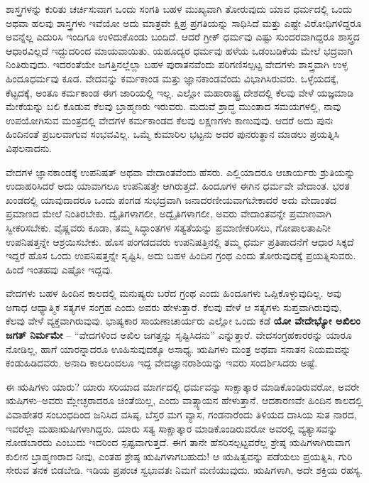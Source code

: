 ಶಾಸ್ತ್ರಗಳನ್ನು ಕುರಿತು ಚರ್ಚಿಸುವಾಗ ಒಂದು ಸಂಗತಿ ಬಹಳ ಮುಖ್ಯವಾಗಿ ತೋರುವುದು ಯಾವ ಧರ್ಮದಲ್ಲಿ ಒಂದು ಅಥವಾ ಹಲವು ಶಾಸ್ತ್ರಗಳು ಇವೆಯೋ ಅದು ಮಾತ್ರವೇ ಕ್ಷಿಪ್ರ ಪ್ರಗತಿಯನ್ನು ಸಾಧಿಸಿದೆ ಮತ್ತು ಎಷ್ಟೇ ವಿರೋಧಿಗಳಿದ್ದರೂ ಅವನ್ನೆಲ್ಲ ಎದುರಿಸಿ ಇಂದಿಗೂ ಉಳಿದುಕೊಂಡು ಬಂದಿದೆ. ಆದರೆ ಗ್ರೀಕ್​ ಧರ್ಮವು ಎಷ್ಟು ಸುಂದರವಾಗಿದ್ದರೂ ಶಾಸ್ತ್ರದ ಆಧಾರವಿಲ್ಲದೆ ಇದ್ದುದರಿಂದ ಮಾಯವಾಯಿತು. ಯಹೂದ್ಯರ ಧರ್ಮವು ಹಳೆಯ ಒಡಂಬಡಿಕೆಯ ಮೇಲೆ ಭದ್ರವಾಗಿ ನಿಂತಿರುವುದು. ಇದರಂತೆಯೇ ಜಗತ್ತಿನಲ್ಲೆಲ್ಲಾ ಬಹಳ ಪುರಾತನವೆಂದು ಪರಿಗಣಿಸಲ್ಪಟ್ಟ ವೇದಗಳು ಶಾಸ್ತ್ರವಾಗಿ ಉಳ್ಳ ಹಿಂದೂಧರ್ಮವು ಕೂಡ. ವೇದವನ್ನು ಕರ್ಮಕಾಂಡ ಮತ್ತು ಜ್ಞಾನಕಾಂಡವೆಂದು ವಿಭಾಗಿಸಿರುವರು. ಒಳ್ಳೆಯದಕ್ಕೆ, ಕೆಟ್ಟದಕ್ಕೆ, ಅಂತೂ ಕರ್ಮಕಾಂಡ ಈಗ ಜಾರಿಯಲ್ಲಿ ಇಲ್ಲ. ಎಲ್ಲೋ ಮಹಾರಾಷ್ಟ್ರ ದೇಶದಲ್ಲಿ ಕೆಲವು ವೇಳೆ ಯಜ್ಞಮಾಡಿ ಮೇಕೆಯನ್ನು ಬಲಿ ಕೊಡುವ ಕೆಲವು ಬ್ರಾಹ್ಮಣರು ಇರುವರು. ಮದುವೆ ಶ್ರಾದ್ಧ ಮುಂತಾದ ಸಮಯಗಳಲ್ಲಿ, ನಾವು ಉಪಯೋಗಿಸುವ ಮಂತ್ರದಲ್ಲಿ ವೇದಗಳ ಕರ್ಮಕಾಂಡದ ಕೆಲವು ಲಕ್ಷಣಗಳು ಕಾಣುವುವು. ಆದರೆ ಅದು ಪುನಃ ಹಿಂದಿನಂತೆ ಪ್ರಬಲವಾಗುವ ಸಂಭವವಿಲ್ಲ. ಒಮ್ಮೆ ಕುಮಾರಿಲ ಭಟ್ಟನು ಅದರ ಪುನರುತ್ಥಾನ ಮಾಡಲು ಪ್ರಯತ್ನಿಸಿ ವಿಫಲನಾದನು.

ವೇದಗಳ ಜ್ಞಾನಕಾಂಡಕ್ಕೆ ಉಪನಿಷತ್​ ಅಥವಾ ವೇದಾಂತವೆಂದು ಹೆಸರು. ಎಲ್ಲಿಯಾದರೂ ಆಚಾರ್ಯರು ಶ್ರುತಿಯನ್ನು ಉದಾಹರಿಸಿದರೆ ಅದು ಯಾವಾಗಲೂ ಉಪ\break ನಿಷತ್ತೇ ಆಗಿರುತ್ತದೆ. ಹಿಂದೂಗಳ ಈಗಿನ ಧರ್ಮವೇ ವೇದಾಂತ. ಭರತ ಖಂಡದಲ್ಲಿ ಯಾವುದಾದರೂ ಒಂದು ಪಂಗಡ ಸುಭದ್ರವಾಗಿ ಜನಾದರಣೀಯವಾಗಬೇಕಾದರೆ ಅದು ವೇದಾಂತದ ಪ್ರಮಾಣದ ಮೇಲೆ ನಿಂತಿರಬೇಕು. ದ್ವೈತಿಗಳಾಗಲೀ, ಅದ್ವೈತಿಗಳಾಗಲೀ, ಅವರು ವೇದಾಂತವನ್ನೇ ಪ್ರಮಾಣವಾಗಿ ಸ್ವೀಕರಿಸಬೇಕು. ವೈಷ್ಣವರು ಕೂಡಾ, ತಮ್ಮ ಸಿದ್ಧಾಂತಗಳ ಸತ್ಯತೆಯನ್ನು ಪ್ರಮಾಣೀಕರಿಸಲು, ಗೋಪಾಲತಾಪಿನೀ ಉಪನಿಷತ್ತನ್ನೇ ಆಶ್ರಯಿಸಬೇಕು. ಹೊಸ ಪಂಗಡದವರು ಉಪನಿಷತ್ತಿನಲ್ಲಿ ತಮ್ಮ ಧರ್ಮ ಪ್ರತಿಪಾದನೆಗೆ ಆಧಾರ ಸಿಕ್ಕದೆ ಇದ್ದರೆ ಹೊಸ ಒಂದು ಉಪನಿಷತ್ತನ್ನೇ ಸೃಷ್ಟಿಸಿ, ಅದು ಬಹಳ ಹಿಂದಿನ ಗ್ರಂಥ ಎಂದು ತೋರುವುದಕ್ಕೆ ಪ್ರಯತ್ನಿಸುವರು. ಹಿಂದೆ ಇಂತಹವು ಎಷ್ಟೋ ಇದ್ದವು.


ವೇದಗಳು ಬಹಳ ಹಿಂದಿನ ಕಾಲದಲ್ಲಿ ಮನುಷ್ಯರು ಬರೆದ ಗ್ರಂಥ ಎಂದು ಹಿಂದೂಗಳು ಒಪ್ಪಿಕೊಳ್ಳುವುದಿಲ್ಲ. ಅವು ಅಗಾಧ ಆಧ್ಯಾತ್ಮಿಕ ಸತ್ಯಗಳ ಸಂಗ್ರಹ ಎಂದು ಅವರು ಹೇಳುತ್ತಾರೆ. ಕೆಲವು ವೇಳೆ ಆ ಸತ್ಯಗಳು ಸುಪ್ತವಾಗಿರುವುವು, ಕೆಲವು ವೇಳೆ ವ್ಯಕ್ತವಾಗಿರುವುವು. ಭಾಷ್ಯಕಾರ ಸಾಯಣಾಚಾರ್ಯರು ಎಲ್ಲೋ ಒಂದು ಕಡೆ \textbf{ಯೋ ವೇದೇಭ್ಯೋ ಅಖಿಲಂ ಜಗತ್​ ನಿರ್ಮಮೇ} – “ವೇದಗಳಿಂದ ಅಖಿಲ ಜಗತ್ತನ್ನು ಸೃಷ್ಟಿಸಿದನು” ಎನ್ನುತ್ತಾರೆ. ವೇದಸಂಗ್ರಹಕಾರರನ್ನು ಯಾರೂ ನೋಡಿಲ್ಲ, ಹಾಗೆ ಯಾರನ್ನಾದರೂ ಊಹಿಸುವುದಕ್ಕೂ ಅಸಾಧ್ಯ. ಋಷಿಗಳು ಮಂತ್ರ ಅಥವಾ ಸನಾತನ ನಿಯಮವನ್ನು ಕಂಡುಹಿಡಿದವರು. ಅನಾದಿ ಕಾಲದಿಂದಲೂ ಇದ್ದ ವೇದಜ್ಞಾನರಾಶಿಯನ್ನು ಇವರು ಸಂದರ್ಶಿಸಿದರು ಅಷ್ಟೆ.

ಈ ಋಷಿಗಳು ಯಾರು? ಯಾರು ಸರಿಯಾದ ಮಾರ್ಗದಲ್ಲಿ ಧರ್ಮವನ್ನು ಸಾಕ್ಷಾತ್ಕಾರ ಮಾಡಿಕೊಂಡಿರುವರೋ, ಅವರೇ ಋಷಿಗಳು–ಅವರು ಮ್ಲೇಚ್ಛರಾದರೂ ಚಿಂತೆಯಿಲ್ಲ, ಎಂದು ವಾತ್ಸ್ಯಾಯನ ಹೇಳುತ್ತಾನೆ. ಆದಕಾರಣವೇ ಹಿಂದಿನ ಕಾಲದಲ್ಲಿ ವಿವಾಹೇತರ ಸಂಬಂಧದಿಂದ ಜನಿಸಿದ ವಸಿಷ್ಠ, ಬೆಸ್ತರ ಮಗ ವ್ಯಾಸ, ಗಂಡನಾರೆಂದು ತಿಳಿಯದ ದಾಸಿಯ ಸುತ ನಾರದ, ಇವರೆಲ್ಲಾ ಮಹಾಋಷಿಗಳಾಗಿದ್ದರು. ಯಾರು ಸತ್ಯ ಸಾಕ್ಷಾತ್ಕಾರ ಮಾಡಿಕೊಂಡಿರುವರೋ ಅವರಲ್ಲಿ ವ್ಯತ್ಯಾಸವನ್ನು ನೋಡಬಾರದು ಎಂಬುದು ಇದರಿಂದ ಸ್ಪಷ್ಟವಾಗುತ್ತದೆ. ಈಗ ತಾನೇ ಹೆಸರಿಸಲ್ಪಟ್ಟವರೆಲ್ಲ ಶ್ರೇಷ್ಠ ಋಷಿಗಳಾಗಿರುವಾಗ ಕುಲೀನ ಬ್ರಾಹ್ಮಣರಾದ ನೀವು, ಎಂತಹ ಶ್ರೇಷ್ಠ ಋಷಿಗಳಾಗಬಹುದು! ಆ ಋಷಿತ್ವವನ್ನು ಪಡೆಯಲು ಪ್ರಯತ್ನಿಸಿ, ಗುರಿ ಸೇರುವ ತನಕ ಬಿಡಬೇಡಿ. ಇಡಿಯ ಪ್ರಪಂಚ ಸ್ವಭಾವತಃ ನಿಮಗೆ ಮಣಿಯುವುದು. ಋಷಿಗಳಾಗಿ, ಅದೇ ಶಕ್ತಿಯ ರಹಸ್ಯ.

